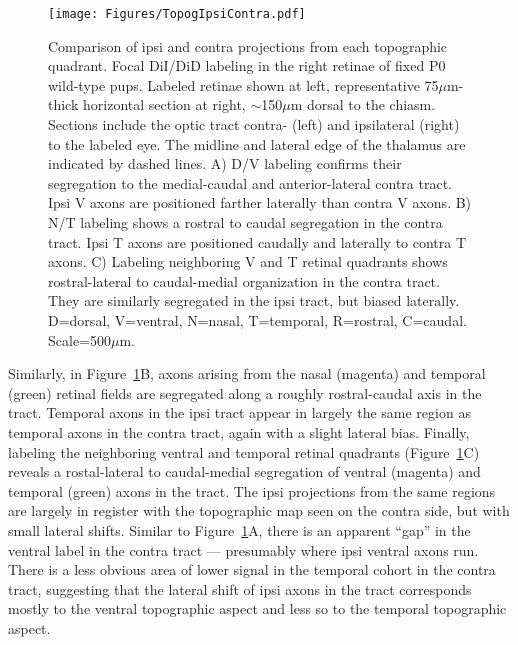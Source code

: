\begin{figure}[hbtp]
    \begin{center}
        \texttt{[image: Figures/TopogIpsiContra.pdf]}
        \caption[Comparison of ipsi and contra projections from each topographic quadrant.]
        {Comparison of ipsi and contra projections from each topographic quadrant.
        Focal DiI/DiD labeling in the right retinae of fixed P0 wild-type pups.
        Labeled retinae shown at left, representative 75$\mu$m-thick horizontal section at right, $\sim$150$\mu$m dorsal to the chiasm.
        Sections include the optic tract contra- (left) and ipsilateral (right) to the labeled eye.
        The midline and lateral edge of the thalamus are indicated by dashed lines.
        A) D/V labeling confirms their segregation to the medial-caudal and anterior-lateral contra tract.
        Ipsi V axons are positioned farther laterally than contra V axons.
        B) N/T labeling shows a rostral to caudal segregation in the contra tract.
        Ipsi T axons are positioned caudally and laterally to contra T axons.
        C) Labeling neighboring V and T retinal quadrants shows rostral-lateral to caudal-medial organization in the contra tract.
        They are similarly segregated in the ipsi tract, but biased laterally.
        D=dorsal, V=ventral, N=nasal, T=temporal, R=rostral, C=caudal.
        Scale=500$\mu$m.}
        \label{Figures/TopogIpsiContra}
    \end{center}
\end{figure}

Similarly, in Figure~\ref{Figures/TopogIpsiContra}B, axons arising from the nasal (magenta) and temporal (green) retinal fields are segregated along a roughly rostral-caudal axis in the tract.
Temporal axons in the ipsi tract appear in largely the same region as temporal axons in the contra tract, again with a slight lateral bias.
Finally, labeling the neighboring ventral and temporal retinal quadrants (Figure~\ref{Figures/TopogIpsiContra}C) reveals a rostal-lateral to caudal-medial segregation of ventral (magenta) and temporal (green) axons in the tract.
The ipsi projections from the same regions are largely in register with the topographic map seen on the contra side, but with small lateral shifts.
Similar to Figure~\ref{Figures/TopogIpsiContra}A, there is an apparent ``gap'' in the ventral label in the contra tract --- presumably where ipsi ventral axons run.
There is a less obvious area of lower signal in the temporal cohort in the contra tract, suggesting that the lateral shift of ipsi axons in the tract corresponds mostly to the ventral topographic aspect and less so to the temporal topographic aspect.

